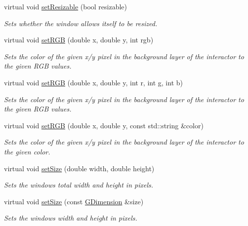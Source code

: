 \begin{DoxyCompactItemize}
\item 
virtual void \mbox{\hyperlink{classGWindow_a8bf0c7d9f9aea44fa74f63a358df7d22}{set\+Resizable}} (bool resizable)
\begin{DoxyCompactList}\small\item\em Sets whether the window allows itself to be resized. \end{DoxyCompactList}\item 
virtual void \mbox{\hyperlink{classGDrawingSurface_a8bcbd65fa784bdab1e66a9efd381162d}{set\+R\+GB}} (double x, double y, int rgb)
\begin{DoxyCompactList}\small\item\em Sets the color of the given x/y pixel in the background layer of the interactor to the given R\+GB values. \end{DoxyCompactList}\item 
virtual void \mbox{\hyperlink{classGDrawingSurface_a81202471d4fc9f2015aef0bc073acfab}{set\+R\+GB}} (double x, double y, int r, int g, int b)
\begin{DoxyCompactList}\small\item\em Sets the color of the given x/y pixel in the background layer of the interactor to the given R\+GB values. \end{DoxyCompactList}\item 
virtual void \mbox{\hyperlink{classGDrawingSurface_ae9a228792d4bb4b628350f39eaa3ad12}{set\+R\+GB}} (double x, double y, const std\+::string \&color)
\begin{DoxyCompactList}\small\item\em Sets the color of the given x/y pixel in the background layer of the interactor to the given color. \end{DoxyCompactList}\item 
virtual void \mbox{\hyperlink{classGWindow_aca25d49481f9bf5fc8f7df4c086c4ce7}{set\+Size}} (double width, double height)
\begin{DoxyCompactList}\small\item\em Sets the window\textquotesingle{}s total width and height in pixels. \end{DoxyCompactList}\item 
virtual void \mbox{\hyperlink{classGWindow_ae2b628228f192c2702c4ce941b2af68f}{set\+Size}} (const \mbox{\hyperlink{classGDimension}{G\+Dimension}} \&size)
\begin{DoxyCompactList}\small\item\em Sets the window\textquotesingle{}s width and height in pixels. \end{DoxyCompactList}\item 

\end{DoxyCompactItemize}
